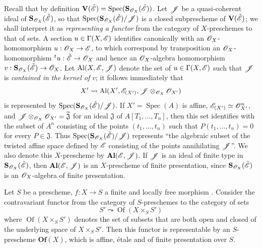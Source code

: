 \begin{env}[18.5.2]
\label{IV.18.5.2}
Recall  that by definition $\mathbf{V}(\check{\mathscr{E}})=\operatorname{Spec}(\mathbf{S}_{\mathscr{O}_X}(\check{\mathscr{E}}))$.
Let $\mathscr{J}$ be a quasi-coherent ideal of $\mathbf{S}_{\mathscr{O}_X}(\check{\mathscr{E}})$, so that $\operatorname{Spec}(\mathbf{S}_{\mathscr{O}_X}(\check{\mathscr{E}})/\mathscr{J})$ is a closed subprescheme of $\mathbf{V}(\check{\mathscr{E}})$; we shall interpret it as \emph{representing a functor} from the category of $X$-preschemes to that of sets.
A section $u\in\Gamma(X,\mathscr{E})$ identifies canonically with an $\mathscr{O}_X$-homomorphism $u:\mathscr{O}_X\to\mathscr{E}$, to which correspond by transposition an $\mathscr{O}_X$-homomorphism ${}^t u:\check{\mathscr{E}}\to\mathscr{O}_X$ and hence an $\mathscr{O}_X$-algebra homomorphism $v:\mathbf{S}_{\mathscr{O}_X}(\check{\mathscr{E}})\to\mathscr{O}_X$.
Let $\mathrm{Al}(X,\mathscr{E},\mathscr{J})$ denote the set of $u\in\Gamma(X,\mathscr{E})$ such that $\mathscr{J}$ is \emph{contained in the kernel of} $v$;
it follows immediately that
\[
X'\leadsto\mathrm{Al}(X',\mathscr{E}_{(X')},\mathscr{J}\otimes_{\mathscr{O}_X}\mathscr{O}_{X'})
\]
is represented by $\operatorname{Spec}(\mathbf{S}_{\mathscr{O}_X}(\check{\mathscr{E}})/\mathscr{J})$.
If $X'=\operatorname{Spec}(A)$ is affine, $\mathscr{E}_{(X')}\simeq\mathscr{O}_{X'}^n$, and $\mathscr{J}\otimes_{\mathscr{O}_X}\mathscr{O}_{X'}=\widetilde{\mathfrak{J}}$ for an ideal $\mathfrak{J}$ of $A[T_1,\ldots,T_n]$, then this set identifies with the subset of $A^n$ consisting of the points $(t_1,\ldots,t_n)$ such that $P(t_1,\ldots,t_n)=0$ for every $P\in\mathfrak{J}$.
Thus $\operatorname{Spec}(\mathbf{S}_{\mathscr{O}_X}(\check{\mathscr{E}})/\mathscr{J})$ represents ``the algebraic subset of the twisted affine space defined by $\mathscr{E}$ consisting of the points annihilating $\mathscr{J}$''.
We also denote this $X$-prescheme by $\mathbf{Al}(\mathscr{E},\mathscr{J})$.
If $\mathscr{J}$ is an ideal of finite type in $\mathbf{S}_{\mathscr{O}_X}(\check{\mathscr{E}})$, then $\mathbf{Al}(\mathscr{E},\mathscr{J})$ is an $X$-prescheme of finite presentation, since $\mathbf{S}_{\mathscr{O}_X}(\check{\mathscr{E}})$ is an $\mathscr{O}_X$-algebra of finite presentation.
\end{env}

\begin{lemma}[18.5.3]
\label{IV.18.5.3}
Let $S$ be a prescheme, $f:X\to S$ a finite and locally free morphism .
Consider the contravariant functor from the category of $S$-preschemes to the category of sets
\[
\label{IV.18.5.3.1}
S'\leadsto\operatorname{Of}(X\times_S S')
\tag{18.5.3.1}
\]
where $\operatorname{Of}(X\times_S S')$ denotes the set of subsets that are both open and closed of the underlying space of $X\times_S S'$.
Then this functor is representable by an $S$-prescheme $\mathbf{Of}(X)$, which is affine, \'etale and of finite presentation over $S$.
\end{lemma}

